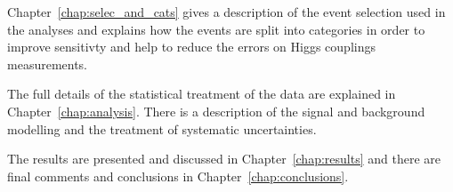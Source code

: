 Chapter~\ref{chap:selec_and_cats} gives a description of the event selection used in the analyses and explains how the events are split into categories in order to improve sensitivty and help to reduce the errors on Higgs couplings measurements.

The full details of the statistical treatment of the data are explained in Chapter~\ref{chap:analysis}. There is a description of the signal and background modelling and the treatment of systematic uncertainties.

The results are presented and discussed in Chapter~\ref{chap:results} and there are final comments and conclusions in Chapter~\ref{chap:conclusions}.
